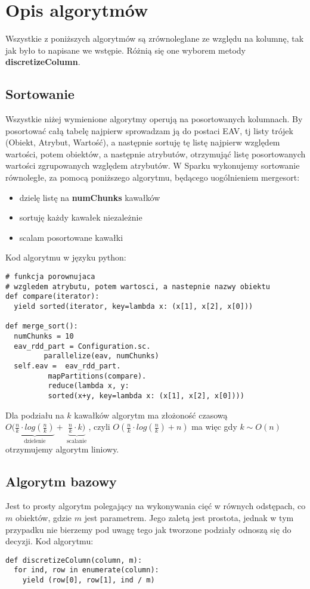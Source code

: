 \documentclass[magisterska]{pracamgr}
\theoremstyle{plain}
\theoremstyle{definition}
\theoremstyle{remark}
\begin{document}
\section{Opis algorytmów}
Wszystkie z poniższych algorytmów są zrównoleglane ze względu na kolumnę, tak 
jak było to napisane we wstępie. Różnią się one wyborem metody \textbf{discretizeColumn}.
\subsection{Sortowanie}
Wszystkie niżej wymienione algorytmy operują na posortowanych kolumnach. By posortować całą tabelę najpierw
sprowadzam ją do postaci EAV, tj listy trójek (Obiekt, Atrybut, Wartość), a następnie sortuję tę listę 
najpierw względem wartości, potem obiektów, a następnie atrybutów, otrzymująć listę posortowanych wartości
zgrupowanych względem atrybutów. W Sparku wykonujemy sortowanie równoległe, za pomocą poniższego algorytmu,
będącego uogólnieniem mergesort:
\begin{itemize}
 \item dzielę listę na \textbf{numChunks} kawałków
 \item sortuję każdy kawałek niezależnie
 \item scalam posortowane kawałki
\end{itemize}
Kod algorytmu w języku python:
\begin{lstlisting}
# funkcja porownujaca
# wzgledem atrybutu, potem wartosci, a nastepnie nazwy obiektu
def compare(iterator):
  yield sorted(iterator, key=lambda x: (x[1], x[2], x[0]))

def merge_sort():
  numChunks = 10
  eav_rdd_part = Configuration.sc.
		 parallelize(eav, numChunks)
  self.eav =  eav_rdd_part.
	      mapPartitions(compare).
	      reduce(lambda x, y: 
	      sorted(x+y, key=lambda x: (x[1], x[2], x[0])))
\end{lstlisting}

Dla podziału na $k$ kawałków algorytm ma złożoność czasową 
$O(\underbrace{\frac{n}{k} \cdot log(\frac{n}{k})}_{\text{ dzielenie }} + \underbrace{\frac{n}{k} \cdot k)}_{\text{ scalanie }}$,
	    czyli $O(\frac{n}{k} \cdot log(\frac{n}{k}) + n)$
ma więc gdy $k \sim O(n)$ otrzymujemy algorytm liniowy.
	      
	      

\subsection{Algorytm bazowy}
Jest to prosty algorytm polegający na wykonywania cięć w równych odstępach, co $m$ obiektów, gdzie
$m$ jest parametrem.
Jego zaletą jest prostota, jednak w tym przypadku nie bierzemy pod uwagę tego jak tworzone podziały odnoszą się do decyzji.
Kod algorytmu:
\begin{lstlisting} 
def discretizeColumn(column, m):
  for ind, row in enumerate(column):
    yield (row[0], row[1], ind / m)
\end{lstlisting}
\end{document}
